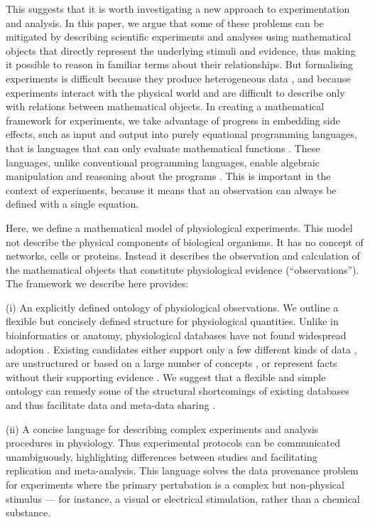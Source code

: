 This suggests that it is worth investigating a new approach to
experimentation and analysis.  In this paper, we argue that some of
these problems can be mitigated by describing scientific experiments
and analyses using mathematical objects that directly represent the
underlying stimuli and evidence, thus making it possible to reason in
familiar terms about their relationships.  But formalising experiments
is difficult because they produce heterogeneous data
\citep{Tukey1962}, and because experiments interact with the physical
world and are difficult to describe only with relations between
mathematical objects. In creating a mathematical framework for
experiments, we take advantage of progress in embedding side effects,
such as input and output \citep{PeytonJones2002, Roy2004, Wadler1995}
into purely equational programming languages, that is languages that
can only evaluate mathematical functions \citep{Church1941}. These
languages, unlike conventional programming languages, enable algebraic
manipulation and reasoning about the programs \citep{Bird1996}. This
is important in the context of experiments, because it means that an
observation can always be defined with a single equation.

Here, we define a mathematical model of physiological
experiments. This model not describe the physical components of
biological organisms. It has no concept of networks, cells or
proteins. Instead it describes the observation and calculation of the
mathematical objects that constitute physiological evidence
(``observations''). The framework we describe here provides:

(i) An explicitly defined ontology of physiological observations. We
outline a flexible but concisely defined structure for physiological
quantities.  Unlike in bioinformatics or anatomy, physiological
databases have not found widespread adoption \citep{Herz2008,
  Amari2002}. Existing candidates either support only a few different
kinds of data \citep{Jessop2010}, are unstructured \citep{Teeters2008}
or based on a large number of concepts \citep{Frishkoff2009}, or
represent facts without their supporting evidence \citep{Katz2010}.
We suggest that a flexible and simple ontology
can remedy some of the structural shortcomings of existing databases
\citep{Gardner2005, Amari2002} and thus facilitate data and meta-data
sharing \citep{Insel2003}.

(ii) A concise language for describing complex experiments and
analysis procedures in physiology. Thus experimental protocols can be
communicated unambiguously, highlighting differences between studies
and facilitating replication and meta-analysis. This language solves
the data provenance problem \citep{Pool2002} for experiments where the
primary pertubation is a complex but non-physical stimulus --- for
instance, a visual or electrical stimulation, rather than a chemical
substance.

